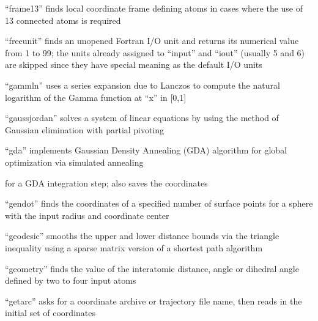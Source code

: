 \documentclass[letterpaper,11pt,english]{sphinxmanual}
\begin{document}

“frame13” finds local coordinate frame defining atoms in cases
where the use of 1\sphinxhyphen{}3 connected atoms is required


“freeunit” finds an unopened Fortran I/O unit and returns
its numerical value from 1 to 99; the units already assigned
to “input” and “iout” (usually 5 and 6) are skipped since
they have special meaning as the default I/O units


“gammln” uses a series expansion due to Lanczos to compute
the natural logarithm of the Gamma function at “x” in {[}0,1{]}


“gaussjordan” solves a system of linear equations by using
the method of Gaussian elimination with partial pivoting


“gda” implements Gaussian Density Annealing (GDA) algorithm
for global optimization via simulated annealing





for a GDA integration step; also saves the coordinates


“gendot” finds the coordinates of a specified number of surface
points for a sphere with the input radius and coordinate center


“geodesic” smooths the upper and lower distance bounds via
the triangle inequality using a sparse matrix version of a
shortest path algorithm


“geometry” finds the value of the interatomic distance, angle
or dihedral angle defined by two to four input atoms


“getarc” asks for a coordinate archive or trajectory file name,
then reads in the initial set of coordinates
\end{document}
